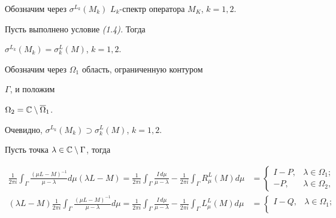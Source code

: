  


Обозначим через $\sigma^{L_k}(M_k)$ $L_k$-спектр оператора $M_K$, $k=1,2$. 


 


\begin{thmm} Пусть выполнено условие {\em (1.4).} Тогда 


$\sigma^{L_k}(M_k)=\sigma^L_k(M)$, $k=1,2$. 


\end{thmm} 


 


\begin{pf} Обозначим через $\Omega_1$ область, ограниченную контуром 


$\Gamma$, и положим 


$\Omega_2=\Bbb C\setminus\overline\Omega_1$. 


Очевидно, $\sigma^{L_k}(M_k)\supset\sigma^L_k(M)$, $k=1,2$. 


Пусть точка $\lambda\in \Bbb C\setminus\Gamma$, тогда 


\begin{align*} 


\frac{1}{2\pi i}\int_\Gamma\frac{(\mu L-M)^{-1}}{\mu-\lambda} 


d\mu(\lambda L-M)= 


\frac{1}{2\pi i}\int_\Gamma\frac{I\,d\mu}{\mu-\lambda} 


-\frac{1}{2\pi i}\int_\Gamma R^L_\mu(M)d\mu &= 


\begin{cases} 


I-P, & \lambda\in\Omega_1;\\ 


-P, & \lambda\in\Omega_2, 


\end{cases} 


\\


(\lambda L-M)\frac{1}{2\pi i}\int_\Gamma\frac{(\mu L-M)^{-1}}{\mu-\lambda} 


d\mu 


=\frac{1}{2\pi i}\int_\Gamma\frac{I\,d\mu}{\mu-\lambda} 


-\frac{1}{2\pi i}\int_\Gamma L^L_\mu(M)d\mu &= 


\begin{cases} 


I-Q, & \lambda\in\Omega_1;\\ 



\end{cases}
\end{align*}
\end{pf}
